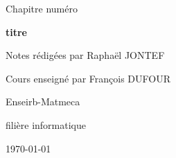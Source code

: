 

\newcommand{\titrechapitre}{titre}
\newcommand{\numerochapitre}{numéro}

\renewcommand{\headrulewidth}{0.4pt}
\renewcommand{\footrulewidth}{0.4pt}
\fancyfoot[C]{\thepage}
\fancyhead[R]{\titrechapitre}




\setlength{\headheight}{15pt}
\begin{titlepage}
    \centering
    \vspace*{3cm}
    {\huge Chapitre \numerochapitre\par}
    {\Huge \bfseries\titrechapitre\par}
    \vspace{2cm}
    {\Large Notes rédigées par Raphaël JONTEF\par}
    \vspace{0.5cm}
    {\normalsize Cours enseigné par François DUFOUR\par}
    \vspace{4cm}
    {\small Enseirb-Matmeca\par}
    {\small filière informatique\par}
    \vfill
    {\large \today\par}
\end{titlepage}

\tableofcontents
\newpage





